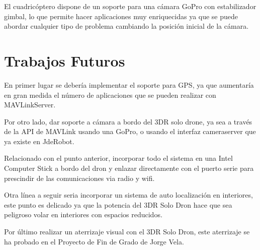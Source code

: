 El cuadricóptero dispone de un soporte para una cámara GoPro con estabilizador gimbal, lo que permite hacer aplicaciones muy enriquecidas ya que se puede abordar cualquier tipo de problema cambiando la posición inicial de la cámara.

\section{Trabajos Futuros}

En primer lugar se debería implementar el soporte para GPS, ya que aumentaría en gran medida el número de aplicaciones que se pueden realizar con MAVLinkServer. 

Por otro lado, dar soporte a cámara a bordo del 3DR solo drone, ya sea a través de la API de MAVLink usando una GoPro, o usando el interfaz cameraserver que ya existe en JdeRobot.

Relacionado con el punto anterior, incorporar todo el sistema en una Intel Computer Stick a bordo del dron y enlazar directamente con el puerto serie para prescindir de las comunicaciones via radio y wifi. 

Otra línea a seguir seria incorporar un sistema de auto localización en interiores, este punto es delicado ya que la potencia del 3DR Solo Dron hace que sea peligroso volar en interiores con espacios reducidos.

Por último realizar un aterrizaje visual con el 3DR Solo Dron, este aterrizaje se ha probado en el Proyecto de Fin de Grado de Jorge Vela\cite{jorgeVelaTFG}.
